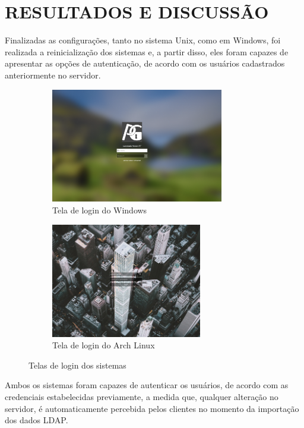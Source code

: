 \section{RESULTADOS E DISCUSSÃO}
Finalizadas as configurações, tanto no sistema Unix, como em Windows, foi realizada a reinicialização dos sistemas e, a partir disso, eles foram capazes de apresentar as opções de autenticação, de acordo com os usuários cadastrados anteriormente no servidor.

\begin{figure}[ht]
    \begin{subfigure}{0.48\textwidth}
    	\centering
    	\includegraphics[height=5cm]{textuais/TelaLoginWindows.png}
    	\caption{Tela de login do Windows
    	\label{fig:telawindows}}
    \end{subfigure}%
    \hspace{0.04\textwidth} %
    \begin{subfigure}{0.48\textwidth}
    	\centering
    	\includegraphics[height=5cm]{textuais/TelaLoginUnix.png}
    	\caption{Tela de login do Arch Linux
    	\label{fig:telaunix}}
    \end{subfigure}
    \caption{Telas de login dos sistemas}
    \label{fig:telaslogin}
\end{figure}

Ambos os sistemas foram capazes de autenticar os usuários, de acordo com as credenciais estabelecidas previamente, a medida que, qualquer alteração no servidor, é automaticamente percebida pelos clientes no momento da importação dos dados LDAP.

